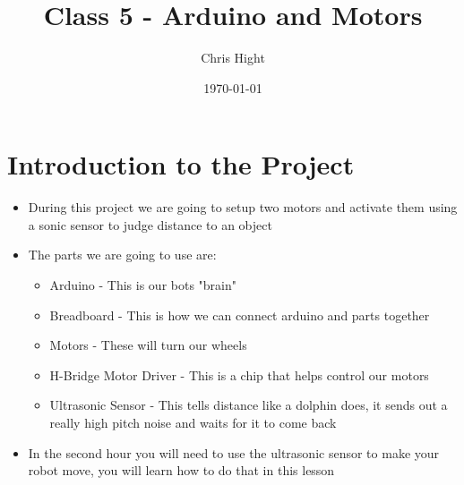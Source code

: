 \documentclass[12pt]{article}
\title{Class 5 - Arduino and Motors}
\author{Chris Hight}
\date{\today}
\begin{document}
\maketitle


\section *{Introduction to the Project}
	\begin{itemize}
		\item During this project we are going to setup two motors and activate them using a sonic sensor to judge distance to an object

		\item The parts we are going to use are:
	
		\begin{itemize}
    		\item Arduino - This is our bots "brain"
    		\item Breadboard - This is how we can connect arduino and parts together
    		\item Motors - These will turn our wheels
    		\item H-Bridge Motor Driver - This is a chip that helps control our motors
    		\item Ultrasonic Sensor - This tells distance like a dolphin does, it sends out a really high pitch noise and waits for it to come back
		\end{itemize}
		
		\item In the second hour you will need to use the ultrasonic sensor to make your robot move, you will learn how to do that in this lesson
	
	\end{itemize}
\end{document}
